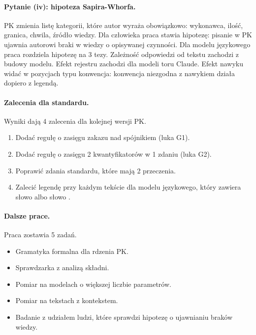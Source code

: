 \paragraph{Pytanie (iv): hipoteza Sapira-Whorfa.}
PK zmienia listę kategorii, które autor wyraża obowiązkowo: wykonawca, ilość, granica,
chwila, źródło wiedzy. Dla człowieka praca stawia hipotezę: pisanie w PK ujawnia autorowi braki
w wiedzy o opisywanej czynności. Dla modelu językowego praca rozdziela hipotezę na 3 tezy.
Zależność odpowiedzi od tekstu zachodzi z budowy modelu. Efekt rejestru zachodzi dla
modeli toru Claude. Efekt nawyku widać w pozycjach typu konwencja: konwencja niezgodna
z nawykiem działa dopiero z legendą.

\paragraph{Zalecenia dla standardu.}
Wyniki dają 4 zalecenia dla kolejnej wersji PK.
\begin{enumerate}[leftmargin=1.8em,itemsep=1pt]
  \item Dodać regułę o zasięgu zakazu nad spójnikiem  (luka G1).
  \item Dodać regułę o zasięgu 2 kwantyfikatorów w 1 zdaniu (luka G2).
  \item Poprawić \pkCorpusStdCfive{} zdania standardu, które mają 2 przeczenia.
  \item Zalecić legendę przy każdym tekście dla modelu językowego, który zawiera słowo
   albo słowo .
\end{enumerate}

\paragraph{Dalsze prace.}
Praca zostawia 5 zadań.
\begin{itemize}[leftmargin=1.6em,itemsep=1pt]
  \item Gramatyka formalna dla rdzenia PK.
  \item Sprawdzarka z analizą składni.
  \item Pomiar na modelach o większej liczbie parametrów.
  \item Pomiar na tekstach z kontekstem.
  \item Badanie z udziałem ludzi, które sprawdzi hipotezę o ujawnianiu braków wiedzy.
\end{itemize}
